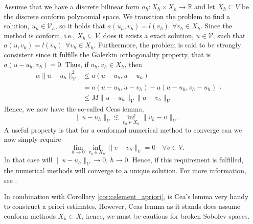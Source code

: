 Assume that we have a discrete bilinear form $a_{h}: X_{h}\times X_{h} \to \mathbb{R} $ and let $X _{h} \subseteq  V $ be the discrete conform polynomial space. We transition the problem to find a solution, $u_{h} \in  \mathcal{V}_{h}$, so it holds that $a\left( u_{h},v_{h} \right)  = l\left( v_{h} \right) \ \  \forall v_{h} \in X _{h} $.
Since the method is conform, i.e., $X _{h} \subseteq  V $, does it exists a exact solution, $u \in  \mathcal{V}$, such that \(
a \left( u, v_{h} \right)  = l\left( v_{h} \right)  \ \  \forall v_{h} \in  X _{h}.
\)
Furthermore, the problem is said to be strongly consistent since it fulfills the Galerkin orthogonality property, that is $ a\left( u -u_{h} , v_{h} \right)  =0$. Thus, if $u_{h},v_{h} \in  X _{h}$, then
\begin{equation}
\label{eq:cealemma_proof}
    \begin{split}
\alpha \| u -u_{h} \|_{ V  }^{ 2 } & \le  a\left( u - u_{h}, u - u_{h}  \right)    \\
&= a\left( u - u_{h}, u -v_{h} \right) - a\left( u -u_{h}, v_{h} - u_{h} \right)  \\
 &  \le  M \| u - u_{h} \|_{ V  }^{  }  \| u - v_{h} \|_{ V  }^{  }
    \end{split}
.\end{equation}
Hence, we now have the so-called Ceas lemma, \[
\| u - u_{h} \|_{ V  }^{  }  \lesssim  \inf_{v_{h} \in X_{h} } \|  v_{h} - u \|_{V  }^{  }.
\]
A useful property is that for a conformal numerical method to converge can we now simply require \[
\lim_{h \to 0}  \inf_{v_{h} \in  X_{h}}  \| v - v_{h} \|_{ V  }^{  } = 0 \quad  \forall v \in V.
\]
In that case will $\| u - u_{h} \|_{ V  }^{  }  \to  0$, $h \to  0$. Hence, if this requirement is fulfilled, the numerical methods will converge to a unique solution.
For more information, see \cite[p. 66]{quartdiff}.

In combination with Corollary \ref{cor:celement_apriori}, is Cea's lemma very handy to construct a priori estimates. However, Ceas lemma as it stands does assume conform methods $X_{h} \subset X$, hence, we must be cautious for broken Sobolev spaces.




